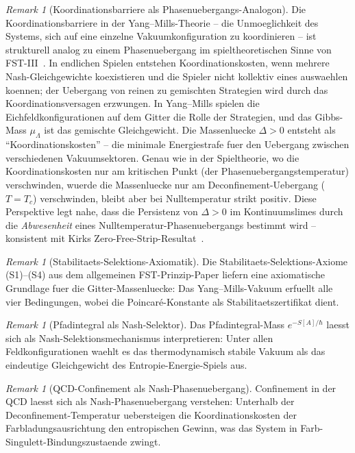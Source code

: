 \documentclass[12pt,a4paper]{article}
\theoremstyle{definition}
\theoremstyle{plain}
\theoremstyle{remark}
\newtheorem{remark}[definition]{Remark}
\begin{document}
\begin{remark}[Koordinationsbarriere als Phasenuebergangs-Analogon]
\label{rem:coordination-barrier}
Die Koordinationsbarriere in der Yang--Mills-Theorie -- die
Unmoeglichkeit des Systems, sich auf eine einzelne Vakuumkonfiguration
zu koordinieren -- ist strukturell analog zu einem Phasenuebergang
im spieltheoretischen Sinne von FST-III~\cite{FST-Unified2026}.
In endlichen Spielen entstehen Koordinationskosten, wenn mehrere
Nash-Gleichgewichte koexistieren und die Spieler nicht kollektiv eines
auswaehlen koennen; der Uebergang von reinen zu gemischten Strategien
wird durch das Koordinationsversagen erzwungen.
In Yang--Mills spielen die Eichfeldkonfigurationen auf dem Gitter die
Rolle der Strategien, und das Gibbs-Mass $\mu_\Lambda$ ist das gemischte
Gleichgewicht. Die Massenluecke $\Delta > 0$ entsteht als
``Koordinationskosten'' -- die minimale Energiestrafe fuer den
Uebergang zwischen verschiedenen Vakuumsektoren. Genau wie in der
Spieltheorie, wo die Koordinationskosten nur am kritischen Punkt
(der Phasenuebergangstemperatur) verschwinden, wuerde die Massenluecke
nur am Deconfinement-Uebergang ($T = T_c$) verschwinden, bleibt aber
bei Nulltemperatur strikt positiv. Diese Perspektive legt nahe, dass
die Persistenz von $\Delta > 0$ im Kontinuumslimes durch die
\emph{Abwesenheit} eines Nulltemperatur-Phasenuebergangs bestimmt
wird -- konsistent mit Kirks
Zero-Free-Strip-Resultat~\cite{Kirk2026b}.
\end{remark}

\begin{remark}[Stabilitaets-Selektions-Axiomatik]
\label{rem:stability-selection}
Die Stabilitaets-Selektions-Axiome (S1)--(S4) aus dem allgemeinen FST-Prinzip-Paper liefern eine axiomatische Grundlage fuer die Gitter-Massenluecke: Das Yang--Mills-Vakuum erfuellt alle vier Bedingungen, wobei die Poincar\'e-Konstante als Stabilitaetszertifikat dient.
\end{remark}

\begin{remark}[Pfadintegral als Nash-Selektor]
\label{rem:path-integral-nash}
Das Pfadintegral-Mass $e^{-S[A]/\hbar}$ laesst sich als Nash-Selektionsmechanismus interpretieren: Unter allen Feldkonfigurationen waehlt es das thermodynamisch stabile Vakuum als das eindeutige Gleichgewicht des Entropie-Energie-Spiels aus.
\end{remark}

\begin{remark}[QCD-Confinement als Nash-Phasenuebergang]
\label{rem:qcd-confinement-nash}
Confinement in der QCD laesst sich als Nash-Phasenuebergang verstehen: Unterhalb der Deconfinement-Temperatur uebersteigen die Koordinationskosten der Farbladungsausrichtung den entropischen Gewinn, was das System in Farb-Singulett-Bindungszustaende zwingt.
\end{remark}
\end{document}

